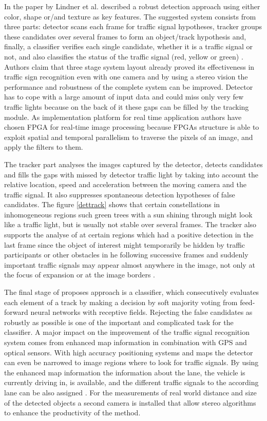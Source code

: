 \documentclass[letterpaper, 10 pt, conference]{ieeeconf} %
\begin{document}
In the paper by Lindner et al. described a robust detection approach using either color, shape or/and texture as key features. The suggested system consists from three parts: detector scans each frame for traffic signal hypotheses, tracker groups these candidates over several frames to form an object/track hypothesis and, finally, a classifier verifies each single candidate, whether it is a traffic signal or not, and also classifies the status of the traffic signal (red, yellow or green) \cite{c6}. Authors claim that three stage system layout already proved its effectiveness in traffic sign recognition even with one camera and by using a stereo vision the performance and robustness of the complete system can be improved. Detector has to cope with a large amount of input data and could miss only very few traffic lights because on the back of it these gaps can be filled by the tracking module. As implementation platform for real time application authors have chosen FPGA for real-time image processing because FPGAs structure is able to exploit spatial and temporal parallelism to traverse the pixels of an image, and apply the filters to them.

The tracker part analyses the images captured by the detector, detects candidates and fills the gaps with missed by detector traffic light by taking into account the relative location, speed and acceleration between the moving camera and the traffic signal. It also suppresses spontaneous detection hypotheses of false candidates. The figure \ref{dettrack} shows that certain constellations in inhomogeneous regions such green trees with a sun shining through might look like a traffic light, but is usually not stable over several frames. The tracker also supports the analyse of at certain regions which had a positive detection in the last frame since the object of interest might temporarily be hidden by traffic participants or other obstacles in he following successive frames and suddenly important traffic signals may appear almost anywhere in the image, not only at the focus of expansion or at the image borders \cite{c6}.

The final stage of proposes approach is a classifier, which consecutively evaluates each element of a track by making a decision by soft majority voting from feed-forward neural networks with receptive fields. Rejecting the false candidates as robustly as possible is one of the important and complicated task for the classifier. A major impact on the improvement of the traffic signal recognition system comes from enhanced map information in combination with GPS and optical sensors. With high accuracy positioning systems and maps the detector can even be narrowed to image regions where to look for traffic signals. By using the enhanced map information the information about the lane, the vehicle is currently driving in, is available, and the different traffic signals to the according lane can be also assigned \cite{c6}. For the measurements of real world distance and size of the detected objects a second camera is installed that allow stereo algorithms to enhance the productivity of the method.
\end{document}
